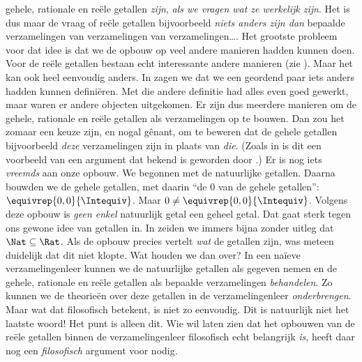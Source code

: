 \documentclass[openany]{memoir}
\begin{document}
gehele, rationale en reële getallen \emph{zijn}, \emph{als we vragen
wat ze werkelijk zijn}. Het is dus maar de vraag of reële getallen
bijvoorbeeld \emph{niets anders zijn dan} bepaalde verzamelingen van
verzamelingen van verzamelingen\ldots. Het grootste probleem voor dat idee
is dat we de opbouw op veel andere manieren hadden kunnen doen. Voor de reële getallen bestaan echt
interessante andere manieren (zie ). Maar het kan
ook heel eenvoudig anders. In  zagen we dat
we een geordend paar iets anders hadden kunnen definiëren. Met die
andere definitie had alles even goed gewerkt, maar waren er andere
objecten uitgekomen. Er zijn dus meerdere manieren om de gehele,
rationale en reële getallen als verzamelingen op te bouwen. Dan zou het
zomaar een keuze zijn, en nogal gênant, om te beweren dat de gehele
getallen bijvoorbeeld \emph{deze} verzamelingen zijn in plaats van
\emph{die}. (Zoals in  is dit een voorbeeld
van een argument dat bekend is geworden door
\citealt{Benacerraf1965}.)
Er is nog iets \emph{vreemds} aan onze opbouw. We begonnen met de
natuurlijke getallen. Daarna bouwden we de gehele getallen, met daarin
``de $0$ van de gehele getallen'': $ \equivrep{0,0}{\Intequiv}$. Maar
$0 \neq \equivrep{0,0}{\Intequiv}$. Volgens deze opbouw is
\emph{geen enkel} natuurlijk getal een geheel getal. Dat gaat sterk
tegen ons gewone idee van getallen in. In
 zeiden we immers bijna zonder uitleg dat
$\Nat \subseteq \Rat$. Als de opbouw precies vertelt \emph{wat} de
getallen zijn, was meteen duidelijk dat dit niet klopte.
Wat houden we dan over? In een na\"ieve verzamelingenleer kunnen we de
natuurlijke getallen als gegeven nemen en de gehele, rationale en reële
getallen als bepaalde verzamelingen \emph{behandelen}. Zo kunnen we de
theorieën over deze getallen in de verzamelingenleer \emph{onderbrengen}.
Maar wat dat filosofisch betekent, is niet zo eenvoudig.
Dit is natuurlijk niet het laatste woord!{} Het punt is alleen dit. Wie
wil laten zien dat het opbouwen van de reële getallen binnen de
verzamelingenleer filosofisch echt
belangrijk \emph{is}, heeft daar nog een \emph{filosofisch} argument
voor nodig.
\endgroup

\begingroup
\def\olfilename{OLP-0047}
\def\olfilepath{content/sets-functions-relations/arithmetization/}
\hypertarget{unit-OLP-0047}{}
%
\end{document}
